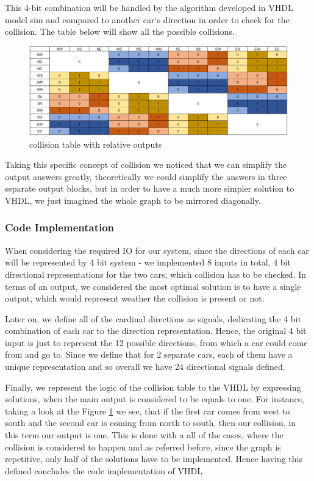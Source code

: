 \documentclass[conference]{IEEEtran}
\begin{document}
This 4-bit combination will be handled by the algorithm developed in VHDL model sim and compared to another car`s direction in order to check for the collision. The table below will show all the possible collisions.

\begin{figure}[h]
    \centerline{\includegraphics[scale=0.32]{collision table.png}}
    \caption{collision table with relative outputs}
    \label{table}
\end{figure}

Taking this specific concept of collision we noticed that we can simplify the output answers greatly, theoretically we could simplify the answers in three separate output blocks, but in order to have a much more simpler solution to VHDL, we just imagined the whole graph to be mirrored diagonally.


\subsubsection{Code Implementation}

When considering the required IO for our system, since the directions of each car will be represented by 4 bit system - we implemented 8 inputs in total, 4 bit directional representations for the two cars, which collision has to be checked. In terms of an output, we considered the most optimal solution is to have a single output, which would represent weather the collision is present or not.

Later on, we define all of the cardinal directions as signals, dedicating the 4 bit combination of each car to the direction representation. Hence, the original 4 bit input is just to represent the 12 possible directions, from which a car could come from and go to. Since we define that for 2 separate cars, each of them have a unique representation and so overall we have 24 directional signals defined.

Finally, we represent the logic of the collision table to the VHDL by expressing solutions, when the main output is considered to be equals to one. For instance, taking a look at the Figure \ref{table} we see, that if the first car comes from west to south and the second car is coming from north to south, then our collision, in this term our output is one. This is done with a all of the cases, where the collision is considered to happen and as referred before, since the graph is repetitive, only half of the solutions have to be implemented. Hence having this defined concludes the code implementation of VHDL
\end{document}
